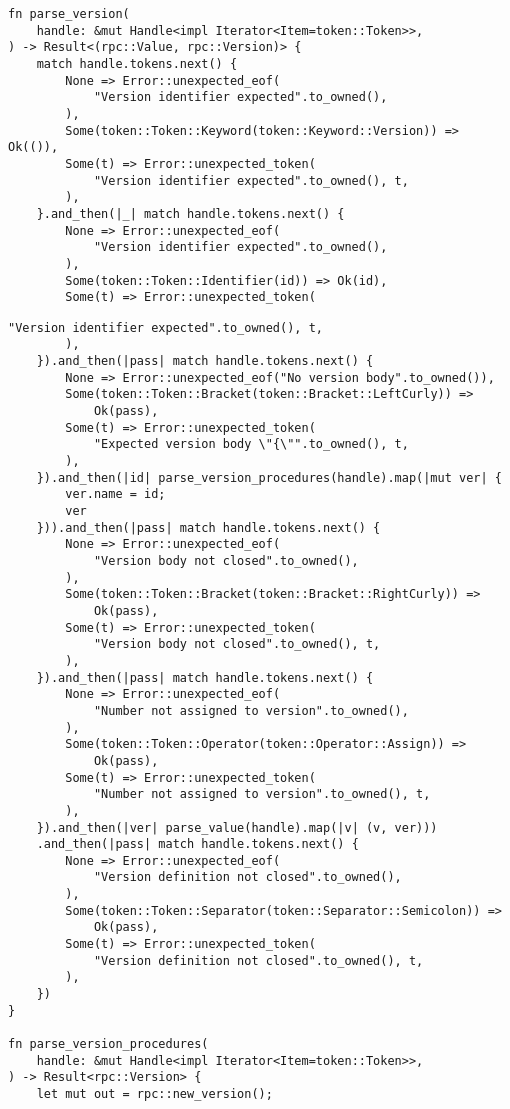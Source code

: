 \begin{lstlisting}[caption={Разбор версии (часть 1)}, label={lst:rust_parser_version1}]
fn parse_version(
    handle: &mut Handle<impl Iterator<Item=token::Token>>,
) -> Result<(rpc::Value, rpc::Version)> {
    match handle.tokens.next() {
        None => Error::unexpected_eof(
            "Version identifier expected".to_owned(),
        ),
        Some(token::Token::Keyword(token::Keyword::Version)) => Ok(()),
        Some(t) => Error::unexpected_token(
            "Version identifier expected".to_owned(), t,
        ),
    }.and_then(|_| match handle.tokens.next() {
        None => Error::unexpected_eof(
            "Version identifier expected".to_owned(),
        ),
        Some(token::Token::Identifier(id)) => Ok(id),
        Some(t) => Error::unexpected_token(
\end{lstlisting}
\clearpage
\begin{lstlisting}[caption={Разбор версии (часть 2)}, label={lst:rust_parser_version2}]
            "Version identifier expected".to_owned(), t,
        ),
    }).and_then(|pass| match handle.tokens.next() {
        None => Error::unexpected_eof("No version body".to_owned()),
        Some(token::Token::Bracket(token::Bracket::LeftCurly)) =>
            Ok(pass),
        Some(t) => Error::unexpected_token(
            "Expected version body \"{\"".to_owned(), t,
        ),
    }).and_then(|id| parse_version_procedures(handle).map(|mut ver| {
        ver.name = id;
        ver
    })).and_then(|pass| match handle.tokens.next() {
        None => Error::unexpected_eof(
            "Version body not closed".to_owned(),
        ),
        Some(token::Token::Bracket(token::Bracket::RightCurly)) =>
            Ok(pass),
        Some(t) => Error::unexpected_token(
            "Version body not closed".to_owned(), t,
        ),
    }).and_then(|pass| match handle.tokens.next() {
        None => Error::unexpected_eof(
            "Number not assigned to version".to_owned(),
        ),
        Some(token::Token::Operator(token::Operator::Assign)) =>
            Ok(pass),
        Some(t) => Error::unexpected_token(
            "Number not assigned to version".to_owned(), t,
        ),
    }).and_then(|ver| parse_value(handle).map(|v| (v, ver)))
    .and_then(|pass| match handle.tokens.next() {
        None => Error::unexpected_eof(
            "Version definition not closed".to_owned(),
        ),
        Some(token::Token::Separator(token::Separator::Semicolon)) =>
            Ok(pass),
        Some(t) => Error::unexpected_token(
            "Version definition not closed".to_owned(), t,
        ),
    })
}

fn parse_version_procedures(
    handle: &mut Handle<impl Iterator<Item=token::Token>>,
) -> Result<rpc::Version> {
    let mut out = rpc::new_version();
\end{lstlisting}
